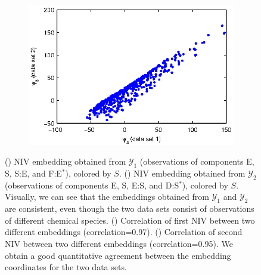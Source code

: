 \begin{figure}[t]
\begin{subfigure}{0.4\textwidth}
\caption{}
\label{subfig:rxn_corr1}
\end{subfigure}
\begin{subfigure}{0.4\textwidth}
\includegraphics[width=\textwidth]{rxn_NLICA_corr2}
\caption{}
\label{subfig:rxn_corr2}
\end{subfigure}
\caption[Intrinsic variable embeddings for chemical reaction network data]{() NIV embedding obtained from $\mathcal{Y}_1$ (observations of components E, S, S:E, and F:E$^{*}$), colored by $S$. () NIV embedding obtained from $\mathcal{Y}_2$ (observations of components E, S, E:S, and D:S$^{*}$), colored by $S$. Visually, we can see that the embeddings obtained from $\mathcal{Y}_1$ and $\mathcal{Y}_2$ are consistent, even though the two data sets consist of observations of different chemical species. () Correlation of first NIV between two different embeddings (correlation=0.97). ()  Correlation of second NIV between two different embeddings (correlation=0.95). We obtain a good quantitative agreement between the embedding coordinates for the two data sets.}
    \label{fig:rxn_embedding}
\end{figure}

